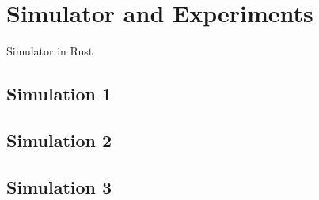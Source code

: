 \section{Simulator and Experiments}

Simulator in Rust

\subsection{Simulation 1}
\subsection{Simulation 2}
\subsection{Simulation 3}